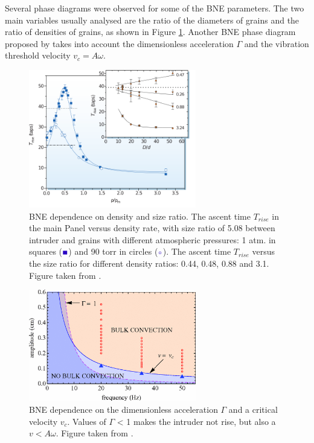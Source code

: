     Several phase diagrams were observed for some of the BNE parameters. The two main variables usually analysed are the ratio of the diameters of grains and the ratio of densities of grains, as shown in Figure \ref{fig:BNE_mobius}. Another BNE phase diagram proposed by \cite{Scaling_behavior_in_convection-driven_Brazil-nut_effect} takes into account the dimensionless acceleration $\Gamma$ and the vibration threshold velocity $v_c = A \omega$.

\begin{figure}
    \centering
    \includegraphics[width=0.65\textwidth]{04-figuras/BNE_Mobius.png}
    \caption[Phase diagram of BNE: density ratio and size ratio.]{BNE dependence on density and size ratio. The ascent time $T_{rise}$ in the main Panel versus density rate, with size ratio of 5.08 between intruder and grains with different atmospheric pressures: 1 atm. in squares ($\textcolor{blue}{\blacksquare}$) and 90 torr in circles ($\textcolor{blue}{\circ}$). The ascent time $T_{rise}$ versus the size ratio for different density ratios: 0.44, 0.48, 0.88 and 3.1. Figure taken from \cite{Brazil-Nut_effect_Size_separation_of_granular_particles}.}
    \label{fig:BNE_mobius}
\end{figure}

\begin{figure}
    \centering
    \includegraphics[width=0.65\textwidth]{04-figuras/BNE_Hejmady_PhaseSpace.png}
    \caption[Phase diagram of BNE: $\Gamma$ and $v_c$.]{BNE dependence on the dimensionless acceleration $\Gamma$ and a critical velocity $v_c$. Values of $\Gamma$ < 1 makes the intruder not rise, but also a $v < A \omega$. Figure taken from \cite{Scaling_behavior_in_convection-driven_Brazil-nut_effect}.}
    \label{fig:BNE_hejmady_convection}
\end{figure}

